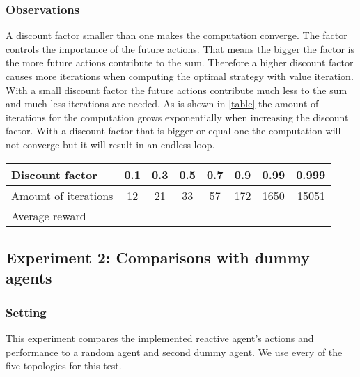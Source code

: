 \documentclass[11pt]{article}
\begin{document}
\subsubsection{Observations}
A discount factor smaller than one makes the computation converge. The factor controls the importance of the future actions. That means the bigger the factor is the more future actions contribute to the sum. Therefore a higher discount factor causes more iterations when computing the optimal strategy with value iteration. With a small discount factor the future actions contribute much less to the sum and much less iterations are needed.  As is shown in \ref{table} the amount of iterations for the computation grows exponentially when increasing the discount factor. With a discount factor that is bigger or equal one the computation will not converge but it will result in an endless loop.

\begin{table*}
\centering
\begin{tabular}{l*{6}{c}r}
Discount factor             & 0.1 & 0.3 & 0.5 & 0.7  & 0.9 & 0.99& 0.999 \\
\hline
Amount of iterations        &12	& 21 & 33 &	57 &172& 1650&15051 \\
Average reward
\end{tabular}
\caption{discount factor's influence on the amount of iterations to compute the optimal strategy }
\label{table} 
\end{table*}





\subsection{Experiment 2: Comparisons with dummy agents}



\subsubsection{Setting}
This experiment compares the implemented reactive agent's actions and performance to a random agent and second dummy agent.
We use every of the five topologies for this test.
\end{document}
